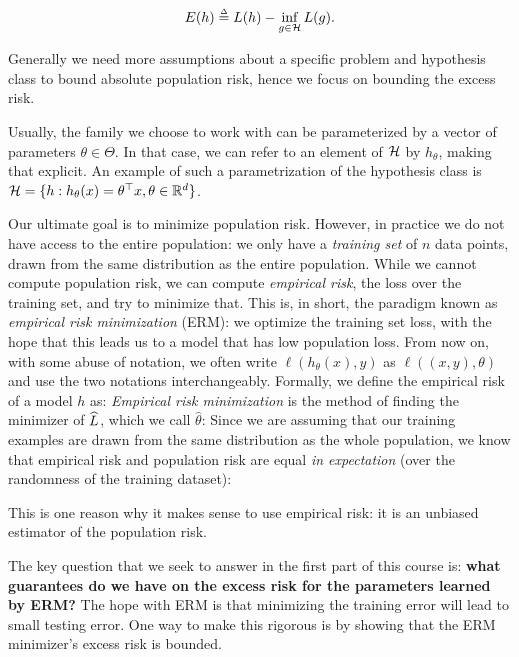 $$E(h) \defeq{} L(h) - \inf_{g\in\cH} L(g).$$

Generally we need more assumptions about a specific problem and hypothesis class to bound absolute population risk, hence we focus on bounding the excess risk.

Usually, the family we choose to work with can be parameterized by a vector of parameters $\theta \in \Theta$. In that case, we can refer to an element of $\mathcal H$ by $h_\theta$, making that explicit. An example of such a parametrization of the hypothesis class is $\mathcal H = \{ h: h_\theta(x) = \theta^\top x, \theta \in \mathbb{R}^d \}$.


Our ultimate goal is to minimize population risk. However, in practice we do not have access to the entire population: we only have a \emph{training set} of $n$ data points, drawn from the same distribution as the entire population. While we cannot compute population risk, we can compute \emph{empirical risk}, the loss over the training set, and try to minimize that. This is, in short, the paradigm known as \emph{empirical risk minimization} (ERM): we optimize the training set loss, with the hope that this leads us to a model that has low
population loss. From now on, with some abuse of notation, we often write $\ell(h_\theta(x),y)$ as $\ell((x,y),\theta)$ and use the two notations interchangeably.  Formally, we define the empirical risk of a model $h$ as:
\emph{Empirical risk minimization} is the method of finding the minimizer of $\widehat{L}$, which we call $\hat{\theta}$:
Since we are assuming that our training examples are drawn from the same distribution as the whole population, we know that empirical risk and population risk are equal
\emph{in expectation} (over the randomness of the training dataset):


This is one reason why it makes sense to use empirical risk: it is an unbiased estimator of the population risk.

The key question that we seek to answer in the first part of this course is: \textbf{what guarantees do we have on the excess risk for the parameters learned by ERM?} The hope with ERM is that minimizing the training error will lead to small testing error. One way to make this rigorous is by showing that the ERM minimizer's excess risk is bounded.
